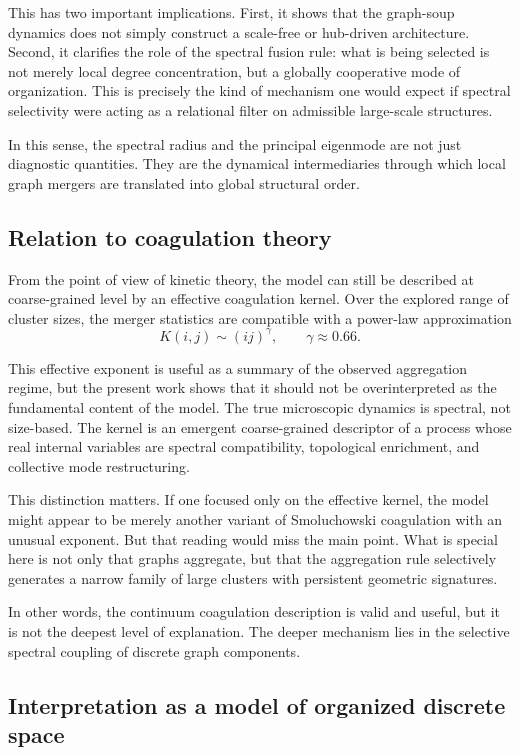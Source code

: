\documentclass[11pt]{article}
\begin{document}
This has two important implications.
First, it shows that the graph-soup dynamics does not simply construct a scale-free or hub-driven architecture.
Second, it clarifies the role of the spectral fusion rule:
what is being selected is not merely local degree concentration, but a globally cooperative mode of organization.
This is precisely the kind of mechanism one would expect if spectral selectivity were acting as a relational filter on admissible large-scale structures.

In this sense, the spectral radius and the principal eigenmode are not just diagnostic quantities.
They are the dynamical intermediaries through which local graph mergers are translated into global structural order.

\subsection{Relation to coagulation theory}

From the point of view of kinetic theory, the model can still be described at coarse-grained level by an effective coagulation kernel.
Over the explored range of cluster sizes, the merger statistics are compatible with a power-law approximation
\[
K(i,j)\sim (ij)^\gamma,
\qquad
\gamma \approx 0.66.
\]

This effective exponent is useful as a summary of the observed aggregation regime, but the present work shows that it should not be overinterpreted as the fundamental content of the model.
The true microscopic dynamics is spectral, not size-based.
The kernel is an emergent coarse-grained descriptor of a process whose real internal variables are spectral compatibility, topological enrichment, and collective mode restructuring.

This distinction matters.
If one focused only on the effective kernel, the model might appear to be merely another variant of Smoluchowski coagulation with an unusual exponent.
But that reading would miss the main point.
What is special here is not only that graphs aggregate, but that the aggregation rule selectively generates a narrow family of large clusters with persistent geometric signatures.

In other words, the continuum coagulation description is valid and useful, but it is not the deepest level of explanation.
The deeper mechanism lies in the selective spectral coupling of discrete graph components.

\subsection{Interpretation as a model of organized discrete space}
\end{document}
